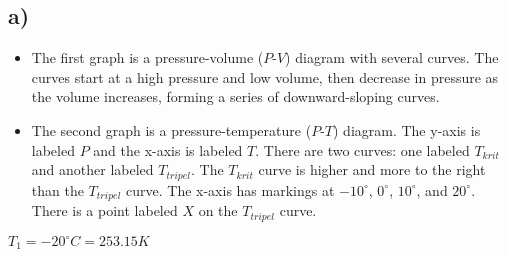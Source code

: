 

\subsection*{a)}

\begin{itemize}
    \item The first graph is a pressure-volume ($P$-$V$) diagram with several curves. The curves start at a high pressure and low volume, then decrease in pressure as the volume increases, forming a series of downward-sloping curves.
    \item The second graph is a pressure-temperature ($P$-$T$) diagram. The y-axis is labeled $P$ and the x-axis is labeled $T$. There are two curves: one labeled $T_{krit}$ and another labeled $T_{tripel}$. The $T_{krit}$ curve is higher and more to the right than the $T_{tripel}$ curve. The x-axis has markings at $-10^\circ$, $0^\circ$, $10^\circ$, and $20^\circ$. There is a point labeled $X$ on the $T_{tripel}$ curve.
\end{itemize}

$T_1 = -20^\circ C = 253.15K$